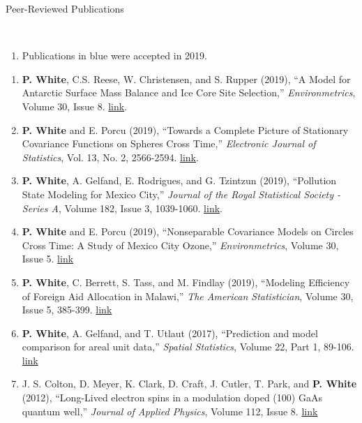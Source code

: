 \documentclass[12pt]{article}
\newcommand{\head}[1]{ %
    \bigskip %
    \begin{large}\begin{bf}{#1}\end{bf}\end{large} %

    \ \\ [-1.3cm] %

    \hrulefill}
\begin{document}
\vspace{2mm}
\head{Peer-Reviewed Publications}
\begin{enumerate}[label=$-$]
\item Publications in {\color{blue} blue} were accepted in 2019.
\end{enumerate}
\begin{enumerate}[label=$\bullet$]
\item { \color{blue} \textbf{P. White}, C.S. Reese, W. Christensen, and S. Rupper (2019), ``A Model for Antarctic Surface Mass Balance and Ice Core Site Selection,'' \emph{Environmetrics}, Volume 30, Issue 8. \href{https://onlinelibrary.wiley.com/doi/abs/10.1002/env.2579}{link}.}
\item { \color{blue} \textbf{P. White} and E. Porcu (2019), ``Towards a Complete Picture of Stationary Covariance Functions on Spheres Cross Time,'' \emph{Electronic Journal of Statistics}, Vol. 13, No. 2, 2566-2594. \href{https://doi.org/10.1214/19-EJS1593}{link}.}
\item {\color{blue}\textbf{P. White}, A. Gelfand, E. Rodrigues, and G. Tzintzun (2019), ``Pollution State Modeling for Mexico City,'' \emph{Journal of the Royal Statistical Society - Series A}, Volume 182, Issue 3, 1039-1060. \href{https://rss.onlinelibrary.wiley.com/doi/abs/10.1111/rssa.12444}{link}.}
\item {\color{blue}\textbf{P. White} and E. Porcu (2019), ``Nonseparable Covariance Models on Circles Cross Time: A Study of Mexico City Ozone,'' \emph{Environmetrics}, Volume 30, Issue 5. \href{https://onlinelibrary.wiley.com/doi/full/10.1002/env.2558}{link}}
\item \textbf{P. White}, C. Berrett, S. Tass, and M. Findlay (2019), ``Modeling Efficiency of Foreign Aid Allocation in Malawi,'' \emph{The American Statistician}, Volume 30, Issue 5, 385-399.  \href{https://www.tandfonline.com/doi/full/10.1080/00031305.2018.1470032}{link}
\item \textbf{P. White}, A. Gelfand, and T. Utlaut (2017), ``Prediction and model comparison for areal unit data,'' \emph{Spatial Statistics}, Volume 22, Part 1, 89-106. \href{http://www.sciencedirect.com/science/article/pii/S2211675317301422}{link}
\item J. S. Colton, D. Meyer, K. Clark, D. Craft, J. Cutler, T. Park, and \textbf{P. White} (2012), ``Long-Lived electron spins in a modulation doped (100) GaAs quantum well,'' \emph{Journal of Applied Physics}, Volume 112, Issue 8.  \href{http://aip.scitation.org/doi/abs/10.1063/1.4759320}{link}
\end{enumerate}
\end{document}
